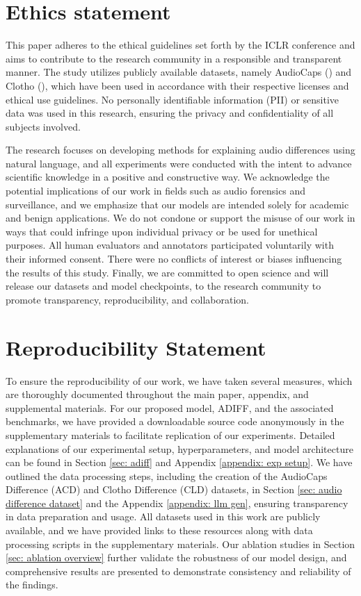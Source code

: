 \section{Ethics statement} \label{appendix: ethics} \vspace{-0.1in}
This paper adheres to the ethical guidelines set forth by the ICLR conference and aims to contribute to the research community in a responsible and transparent manner. The study utilizes publicly available datasets, namely AudioCaps (\cite{audiocaps}) and Clotho (\cite{clotho}), which have been used in accordance with their respective licenses and ethical use guidelines. No personally identifiable information (PII) or sensitive data was used in this research, ensuring the privacy and confidentiality of all subjects involved.

The research focuses on developing methods for explaining audio differences using natural language, and all experiments were conducted with the intent to advance scientific knowledge in a positive and constructive way. We acknowledge the potential implications of our work in fields such as audio forensics and surveillance, and we emphasize that our models are intended solely for academic and benign applications. We do not condone or support the misuse of our work in ways that could infringe upon individual privacy or be used for unethical purposes. All human evaluators and annotators participated voluntarily with their informed consent. There were no conflicts of interest or biases influencing the results of this study. Finally, we are committed to open science and will release our datasets and model checkpoints, to the research community to promote transparency, reproducibility, and collaboration. 

\section{Reproducibility Statement} \label{appendix: reproduce} \vspace{-0.1in}
To ensure the reproducibility of our work, we have taken several measures, which are thoroughly documented throughout the main paper, appendix, and supplemental materials. For our proposed model, ADIFF, and the associated benchmarks, we have provided a downloadable source code anonymously in the supplementary materials to facilitate replication of our experiments. Detailed explanations of our experimental setup, hyperparameters, and model architecture can be found in Section \ref{sec: adiff} and Appendix \ref{appendix: exp setup}. We have outlined the data processing steps, including the creation of the AudioCaps Difference (ACD) and Clotho Difference (CLD) datasets, in Section \ref{sec: audio difference dataset} and the Appendix \ref{appendix: llm gen}, ensuring transparency in data preparation and usage. All datasets used in this work are publicly available, and we have provided links to these resources along with data processing scripts in the supplementary materials. Our ablation studies in Section \ref{sec: ablation overview} further validate the robustness of our model design, and comprehensive results are presented to demonstrate consistency and reliability of the findings.

